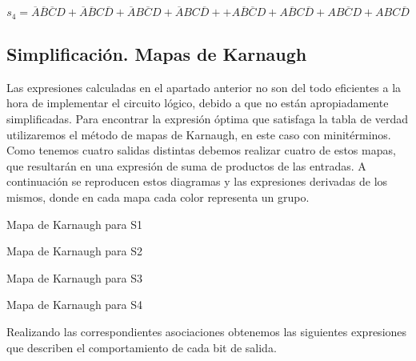 \begin{equation}\label{s4_mini}
    s_{4} = \overline{A}\overline{B}\overline{C}D+\overline{A}\overline{B}C\overline{D}+\overline{A}B\overline{C}D+\overline{A}BC\overline{D}++A\overline{B}\overline{C}D+A\overline{B}C\overline{D}+AB\overline{C}D+ABC\overline{D}
\end{equation}

\subsection{Simplificaci\'on. Mapas de Karnaugh}

Las expresiones calculadas en el apartado anterior no son del todo eficientes a la hora de implementar el circuito l\'ogico, debido a que no están apropiadamente simplificadas. Para encontrar la expresión óptima que satisfaga la tabla de verdad utilizaremos el método de mapas de Karnaugh, en este caso con minitérminos. Como tenemos cuatro salidas distintas debemos realizar cuatro de estos mapas, que resultarán en una expresi\'on de suma de productos de las entradas. A continuaci\'on se reproducen estos diagramas y las expresiones derivadas de los mismos, donde en cada mapa cada color representa un grupo.

\begin{center}

    \begin{Karnaugh}\label{Karnaugh_s1}
    \end{Karnaugh}
    
Mapa de Karnaugh para S1

\begin{Karnaugh}\label{Karnaugh_s2}
    \end{Karnaugh}
    
Mapa de Karnaugh para S2

\begin{Karnaugh}\label{Karnaugh_s4}
     \end{Karnaugh}
    
Mapa de Karnaugh para S3

\begin{Karnaugh}\label{Karnaugh_s4}
    \end{Karnaugh}

Mapa de Karnaugh para S4    
\end{center} 
Realizando las correspondientes asociaciones obtenemos las siguientes expresiones que describen el comportamiento de cada bit de salida.

